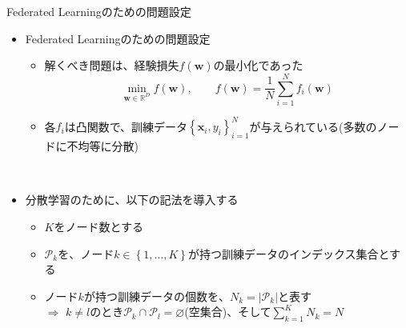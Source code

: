 \documentclass[dvipdfmx,notheorems,t]{beamer}
\begin{document}
\begin{frame}{Federated Learningのための問題設定}

\begin{itemize}
	\item Federated Learningのための問題設定
	\begin{itemize}
		\item 解くべき問題は、経験損失$f(\bm{w})$の最小化であった
		\begin{equation}
			\min_{\bm{w} \in \mathbb{R}^D} f(\bm{w}), \qquad f(\bm{w}) = \frac{1}{N} \sum_{i = 1}^N f_i(\bm{w})
		\end{equation}
		\item 各$f_i$は凸関数で、訓練データ$\left\{ \bm{x}_i, y_i \right\}_{i = 1}^N$が与えられている(多数のノードに不均等に分散)
	\end{itemize} \
	
	\item 分散学習のために、以下の記法を導入する
	\begin{itemize}
		\item $K$を\alert{ノード数}とする
		\item $\mathcal{P}_k$を、ノード$k \in \left\{ 1, \ldots, K \right\}$が持つ訓練データの\alert{インデックス集合}とする
		\item ノード$k$が持つ訓練データの個数を、$N_k = \left| \mathcal{P}_k \right|$と表す \\
		$\Rightarrow$ $k \neq l$のとき$\mathcal{P}_k \cap \mathcal{P}_l = \varnothing$(空集合)、そして$\sum_{k = 1}^K N_k = N$
	\end{itemize}
\end{itemize}

\end{frame}
\end{document}
